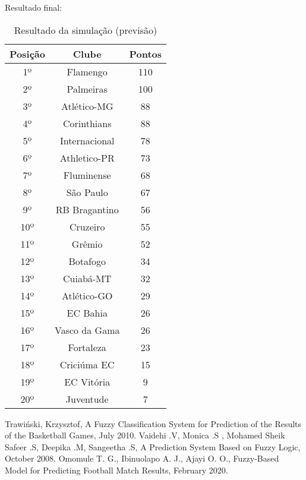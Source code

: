 \documentclass[conference]{IEEEtran}
\begin{document}
\indent Resultado final:

\begin{table}[htbp]
    \caption{Resultado da simulação (previsão)}
    \begin{center}
        \begin{tabular}{|c|c|c|}
        \cline{1-3}
        \textbf{Posição} & \textbf{Clube} & \textbf{Pontos}\\
        \hline
        1º & Flamengo & 110\\
        \hline
        2º & Palmeiras & 100\\
        \hline
        3º & Atlético-MG & 88\\
        \hline
        4º & Corinthians & 88\\
        \hline
        5º & Internacional & 78\\
        \hline
        6º & Athletico-PR & 73\\
        \hline
        7º & Fluminense & 68\\
        \hline
        8º & São Paulo & 67\\
        \hline
        9º & RB Bragantino & 56\\
        \hline
        10º & Cruzeiro & 55\\
        \hline
        11º & Grêmio & 52\\
        \hline
        12º & Botafogo & 34\\
        \hline
        13º & Cuiabá-MT & 32\\
        \hline
        14º & Atlético-GO & 29\\
        \hline
        15º & EC Bahia & 26\\
        \hline
        16º & Vasco da Gama & 26\\
        \hline
        17º & Fortaleza & 23\\
        \hline
        18º & Criciúma EC & 15\\
        \hline
        19º & EC Vitória & 9\\
        \hline
        20º & Juventude & 7\\
        \hline
    \end{tabular}
    \label{tab2}
    \end{center}
\end{table}

\begin{thebibliography}{00}
 Trawiński, Krzysztof, A Fuzzy Classification System for Prediction of the Results of the
Basketball Games, July 2010.
 Vaidehi .V, Monica .S , Mohamed Sheik Safeer .S, Deepika .M, Sangeetha .S, A Prediction System Based on Fuzzy Logic, October 2008.
 Omomule T. G., Ibinuolapo A. J., Ajayi O. O., Fuzzy-Based Model for Predicting Football Match Results, February 2020.
\end{thebibliography}
\end{document}
